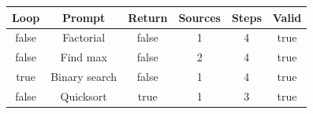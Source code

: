 \begin{table}[h]
\centering
\begin{tabular}{ |c|c|c|c|c|c| }
\hline
Loop & Prompt & Return & Sources & Steps & Valid \\
\hline
false & Factorial & false & 1 & 4 & true \\
\hline
false & Find max & false & 2 & 4 & true \\
\hline
true & Binary search & false & 1 & 4 & true \\
\hline
false & Quicksort & true & 1 & 3 & true \\
\hline
\end{tabular}
\end{table}
